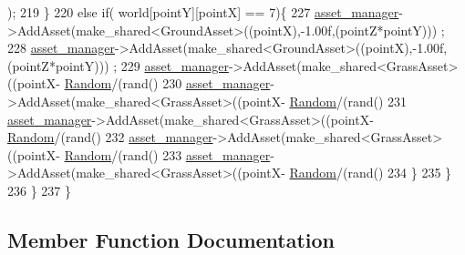 \begin{DoxyCode}
      );
219    \}
220     \textcolor{keywordflow}{else} \textcolor{keywordflow}{if}( world[pointY][pointX] == 7)\{
227             \hyperlink{classGameWorld_aec5c0bca4fb5a41e4aac2dce2871266d}{asset\_manager}->AddAsset(make\_shared<GroundAsset>((pointX),-1.00f,(pointZ*pointY)))
      ;
228             \hyperlink{classGameWorld_aec5c0bca4fb5a41e4aac2dce2871266d}{asset\_manager}->AddAsset(make\_shared<GroundAsset>((pointX),-1.00f,(pointZ*pointY)))
      ;
229             \hyperlink{classGameWorld_aec5c0bca4fb5a41e4aac2dce2871266d}{asset\_manager}->AddAsset(make\_shared<GrassAsset>((pointX-
      \hyperlink{classGameWorld_a56652cc9880b3ba1be61395066c863c3}{Random}/(rand() %
230             \hyperlink{classGameWorld_aec5c0bca4fb5a41e4aac2dce2871266d}{asset\_manager}->AddAsset(make\_shared<GrassAsset>((pointX-
      \hyperlink{classGameWorld_a56652cc9880b3ba1be61395066c863c3}{Random}/(rand() %
231             \hyperlink{classGameWorld_aec5c0bca4fb5a41e4aac2dce2871266d}{asset\_manager}->AddAsset(make\_shared<GrassAsset>((pointX-
      \hyperlink{classGameWorld_a56652cc9880b3ba1be61395066c863c3}{Random}/(rand() %
232             \hyperlink{classGameWorld_aec5c0bca4fb5a41e4aac2dce2871266d}{asset\_manager}->AddAsset(make\_shared<GrassAsset>((pointX-
      \hyperlink{classGameWorld_a56652cc9880b3ba1be61395066c863c3}{Random}/(rand() %
233             \hyperlink{classGameWorld_aec5c0bca4fb5a41e4aac2dce2871266d}{asset\_manager}->AddAsset(make\_shared<GrassAsset>((pointX-
      \hyperlink{classGameWorld_a56652cc9880b3ba1be61395066c863c3}{Random}/(rand() %
234    \}
235   \}
236  \}  
237 \}
\end{DoxyCode}


\subsection{Member Function Documentation}
\hypertarget{classGameWorld_a43080b1c693798b12f7faf28a6b45ab5}{}
